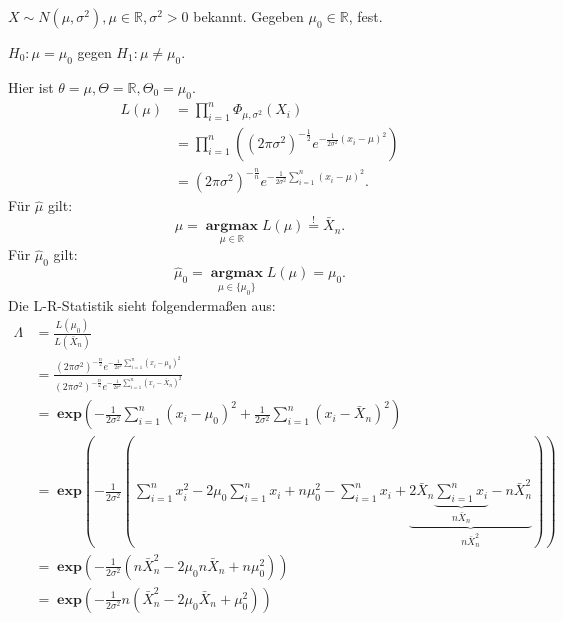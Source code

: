 \documentclass[10pt]{article}
\newcommand{\IR}{\mathbb{R}} %
\newcommand{\sni}{\sum_{i=1}^{n}} %
\newenvironment{BSP}[1][]
{\begin{Beispiel}[frametitle=#1]}{\end{Beispiel}}
\begin{document}
	\begin{BSP}[Beispiel 2.1.1 (z-Test mit zweiseitiger Alternative)]
		$X \sim N(\mu, \sigma^2), \mu \in \IR, \sigma^2 > 0$ bekannt. Gegeben $\mu_0 \in \IR$, fest.
		
		$H_0: \mu = \mu_0$ gegen $H_1: \mu \neq \mu_0$. 
		
		Hier ist $\theta = \mu, \Theta = \IR, \Theta_0 = {\mu_0}$.
		\begin{equation*}
			\begin{split}
				L(\mu) &= \prod_{i = 1}^{n} \Phi_{\mu, \sigma^2} (X_i)\\
				&= \prod_{i = 1}^{n} \left((2\pi \sigma^2)^{-\frac{1}{2}}e^{-\frac{1}{2 \sigma^2} (x_i - \mu)^2}\right)\\
				&= (2\pi \sigma^2)^{-\frac{n}{n}} e^{-\frac{1}{2\sigma^2} \sum_{i=1}^{n}(x_i -\mu)^2}.
			\end{split}
		\end{equation*}
		Für $\hat{\mu}$ gilt:
		\begin{equation*}
			\hat{\mu}= \;\underset{\mu \in \IR}{\textbf{argmax}} \; L(\mu) \overset{!}{=} \bar{X}_n.
		\end{equation*}
		Für $\hat{\mu}_0$ gilt:
		\begin{equation*}
			\hat{\mu}_0= \;\underset{\mu \in \{\mu_0\}}{\textbf{argmax}} \; L(\mu) = \mu_0.
		\end{equation*}
		Die L-R-Statistik sieht folgendermaßen aus:
		\begin{equation*}
		\begin{split}
			\Lambda &= \frac{L(\mu_0)}{L(\bar{X}_n)}\\
			&= \frac{(2 \pi \sigma^2)^{-\frac{n}{2}}e^{-\frac{1}{2 \sigma^2} \sum_{i=1}^{n}(x_i - \mu_0)^2}}{(2 \pi \sigma^2)^{-\frac{n}{2}}e^{-\frac{1}{2 \sigma^2} \sum_{i=1}^{n}(x_i - \bar{X}_n)^2}}\\
			&= \; \textbf{exp}\left(- \frac{1}{2\sigma^2}\sni (x_i - \mu_0)^2 + \frac{1}{2 \sigma^2} \sni (x_i - \bar{X}_n)^2\right)\\
			&= \; \textbf{exp} \left(- \frac{1}{2\sigma^2}(\sni x_i^2 - 2 \mu_0 \sni x_i + n\mu_0^2 - \sni x_i + \underbrace{2 \bar{X}_n \underbrace{\sni x_i}_{n \bar{X}_n} - n\bar{X}^2_n}_{n \bar{X}_n^2})\right)\\
			&= \; \textbf{exp} \left(- \frac{1}{2 \sigma^2} (n \bar{X}_n^2 - 2 \mu_0n\bar{X}_n + n\mu_0^2)\right)\\
			&= \; \textbf{exp} \left(- \frac{1}{2 \sigma^2}n (\bar{X}_n^2 - 2 \mu_0 \bar{X}_n + \mu_0^2)\right) \\

\end{split}
\end{equation*}
\end{BSP}
\end{document}
